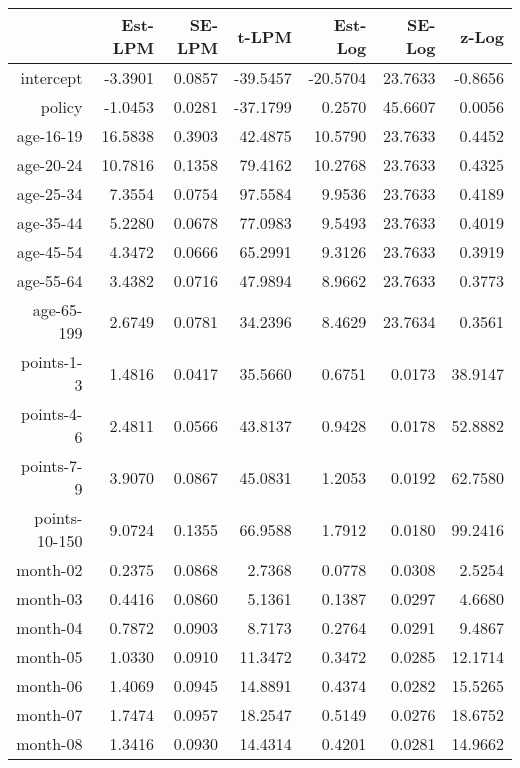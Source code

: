 \documentclass[10pt]{article}
\begin{document}

\begin{table}[ht]
\centering
\begin{tabular}{rrrrrrr}
  \hline
 & Est-LPM & SE-LPM & t-LPM & Est-Log & SE-Log & z-Log \\ 
  \hline
intercept & -3.3901 & 0.0857 & -39.5457 & -20.5704 & 23.7633 & -0.8656 \\ 
  policy & -1.0453 & 0.0281 & -37.1799 & 0.2570 & 45.6607 & 0.0056 \\ 
  age-16-19 & 16.5838 & 0.3903 & 42.4875 & 10.5790 & 23.7633 & 0.4452 \\ 
  age-20-24 & 10.7816 & 0.1358 & 79.4162 & 10.2768 & 23.7633 & 0.4325 \\ 
  age-25-34 & 7.3554 & 0.0754 & 97.5584 & 9.9536 & 23.7633 & 0.4189 \\ 
  age-35-44 & 5.2280 & 0.0678 & 77.0983 & 9.5493 & 23.7633 & 0.4019 \\ 
  age-45-54 & 4.3472 & 0.0666 & 65.2991 & 9.3126 & 23.7633 & 0.3919 \\ 
  age-55-64 & 3.4382 & 0.0716 & 47.9894 & 8.9662 & 23.7633 & 0.3773 \\ 
  age-65-199 & 2.6749 & 0.0781 & 34.2396 & 8.4629 & 23.7634 & 0.3561 \\ 
  points-1-3 & 1.4816 & 0.0417 & 35.5660 & 0.6751 & 0.0173 & 38.9147 \\ 
  points-4-6 & 2.4811 & 0.0566 & 43.8137 & 0.9428 & 0.0178 & 52.8882 \\ 
  points-7-9 & 3.9070 & 0.0867 & 45.0831 & 1.2053 & 0.0192 & 62.7580 \\ 
  points-10-150 & 9.0724 & 0.1355 & 66.9588 & 1.7912 & 0.0180 & 99.2416 \\ 
  month-02 & 0.2375 & 0.0868 & 2.7368 & 0.0778 & 0.0308 & 2.5254 \\ 
  month-03 & 0.4416 & 0.0860 & 5.1361 & 0.1387 & 0.0297 & 4.6680 \\ 
  month-04 & 0.7872 & 0.0903 & 8.7173 & 0.2764 & 0.0291 & 9.4867 \\ 
  month-05 & 1.0330 & 0.0910 & 11.3472 & 0.3472 & 0.0285 & 12.1714 \\ 
  month-06 & 1.4069 & 0.0945 & 14.8891 & 0.4374 & 0.0282 & 15.5265 \\ 
  month-07 & 1.7474 & 0.0957 & 18.2547 & 0.5149 & 0.0276 & 18.6752 \\ 
  month-08 & 1.3416 & 0.0930 & 14.4314 & 0.4201 & 0.0281 & 14.9662 \\ 

\end{tabular}
\end{table}
\end{document}
